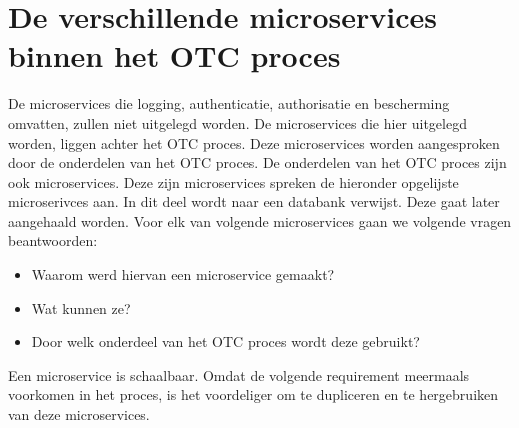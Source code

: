 \begin{table}[]
	\caption{Termen die vaker voorkomen in dit hoofdstuk.}
\end{table}

\section{De verschillende microservices binnen het OTC proces}
De microservices die logging, authenticatie, authorisatie en bescherming omvatten, zullen niet uitgelegd worden.
De microservices die hier uitgelegd worden, liggen achter het OTC proces. Deze microservices worden aangesproken door de onderdelen van het OTC proces. 
De onderdelen van het OTC proces zijn ook microservices. Deze zijn microservices spreken de hieronder opgelijste microserivces aan.
In dit deel wordt naar een databank verwijst. Deze gaat later aangehaald worden.
Voor elk van volgende microservices gaan we volgende vragen beantwoorden:
\begin{itemize}
	\item Waarom werd hiervan een microservice gemaakt?
	\item Wat kunnen ze?
	\item Door welk onderdeel van het OTC proces wordt deze gebruikt?
\end{itemize}

Een microservice is schaalbaar. Omdat de volgende requirement meermaals voorkomen in het proces, is het voordeliger om te dupliceren en te hergebruiken van deze microservices. 

